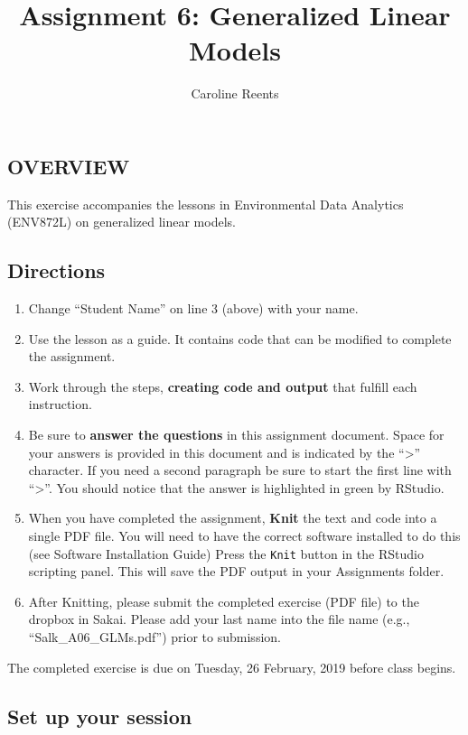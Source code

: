 \documentclass[]{article}
\title{Assignment 6: Generalized Linear Models}
\author{Caroline Reents}
\date{}
\providecommand{\tightlist}{%
  \setlength{\itemsep}{0pt}\setlength{\parskip}{0pt}}
\begin{document}
\maketitle

\subsection{OVERVIEW}\label{overview}

This exercise accompanies the lessons in Environmental Data Analytics
(ENV872L) on generalized linear models.

\subsection{Directions}\label{directions}

\begin{enumerate}
\def\labelenumi{\arabic{enumi}.}
\tightlist
\item
  Change ``Student Name'' on line 3 (above) with your name.
\item
  Use the lesson as a guide. It contains code that can be modified to
  complete the assignment.
\item
  Work through the steps, \textbf{creating code and output} that fulfill
  each instruction.
\item
  Be sure to \textbf{answer the questions} in this assignment document.
  Space for your answers is provided in this document and is indicated
  by the ``\textgreater{}'' character. If you need a second paragraph be
  sure to start the first line with ``\textgreater{}''. You should
  notice that the answer is highlighted in green by RStudio.
\item
  When you have completed the assignment, \textbf{Knit} the text and
  code into a single PDF file. You will need to have the correct
  software installed to do this (see Software Installation Guide) Press
  the \texttt{Knit} button in the RStudio scripting panel. This will
  save the PDF output in your Assignments folder.
\item
  After Knitting, please submit the completed exercise (PDF file) to the
  dropbox in Sakai. Please add your last name into the file name (e.g.,
  ``Salk\_A06\_GLMs.pdf'') prior to submission.
\end{enumerate}

The completed exercise is due on Tuesday, 26 February, 2019 before class
begins.

\subsection{Set up your session}\label{set-up-your-session}
\end{document}
